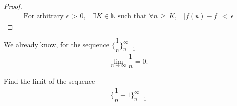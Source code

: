 \begin{theorem}
\begin{proof}
    \begin{align*}
        \text{For arbitrary } \epsilon \hspace{2pt} > \hspace{2pt} 0, \hspace{10pt}  \exists K \in \mathbb{N} \text{ such that } \forall n \hspace{2pt} \geq \hspace{2pt} K, \hspace{10pt} \lvert f(n) - f \rvert \hspace{2pt} < \hspace{2pt} \epsilon
    \end{align*}
\end{proof}
\end{theorem}

\begin{example}
We already know, for the sequence $\Big\{\dfrac{1}{n}\Big\}_{n=1}^{\infty}$
\begin{align*}
    \lim_{n \longrightarrow \infty} \dfrac{1}{n} = 0.
\end{align*}
\end{example}

\begin{exercise}
Find the limit of the sequence
\begin{align*}
    \Big\{\dfrac{1}{n} + 1\Big\}_{n=1}^{\infty}
\end{align*}
\end{exercise}

